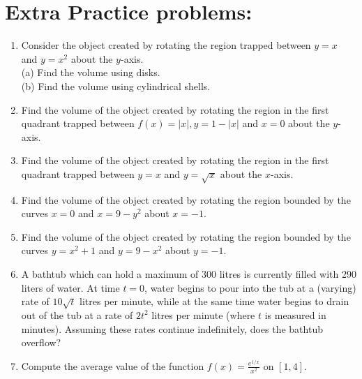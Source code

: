 \documentclass[10pt]{article}
\begin{document}
\section*{Extra Practice problems:}
\begin{enumerate}
  \item Consider the object created by rotating the region trapped between $y=x$ and $y=x^{2}$ about the $y$-axis.\\
(a) Find the volume using disks.\\
(b) Find the volume using cylindrical shells.
  \item Find the volume of the object created by rotating the region in the first quadrant trapped between $f(x)=|x|, y=1-|x|$ and $x=0$ about the $y$-axis.
  \item Find the volume of the object created by rotating the region in the first quadrant trapped between $y=x$ and $y=\sqrt{x}$ about the $x$-axis.
  \item Find the volume of the object created by rotating the region bounded by the curves $x=0$ and $x=9-y^{2}$ about $x=-1$.
  \item Find the volume of the object created by rotating the region bounded by the curves $y=x^{2}+1$ and $y=9-x^{2}$ about $y=-1$.
  \item A bathtub which can hold a maximum of 300 litres is currently filled with 290 liters of water. At time $t=0$, water begins to pour into the tub at a (varying) rate of $10 \sqrt{t}$ litres per minute, while at the same time water begins to drain out of the tub at a rate of $2 t^{2}$ litres per minute (where $t$ is measured in minutes). Assuming these rates continue indefinitely, does the bathtub overflow?
  \item Compute the average value of the function $f(x)=\frac{e^{1 / x}}{x^{2}}$ on $[1,4]$.
\end{enumerate}
\end{document}
